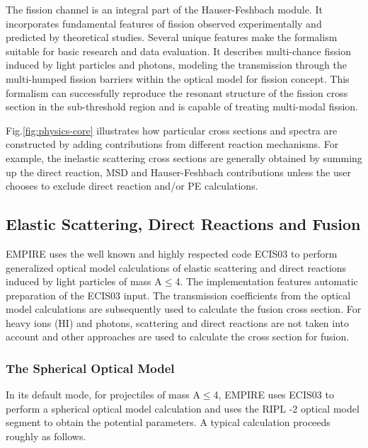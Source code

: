 The fission channel is an integral part of the Hauser-Feshbach module. It
incorporates fundamental features of fission observed experimentally and
predicted by theoretical studies. Several unique features make the formalism
suitable for basic research and data evaluation. It describes multi-chance
fission induced by light particles and photons, modeling the transmission
through the multi-humped fission barriers within the optical model for
fission concept. This formalism can successfully reproduce the resonant
structure of the fission cross section in the sub-threshold region and is
capable of treating multi-modal fission.

Fig.\ref{fig:physics-core} illustrates how particular cross sections and
spectra are constructed by adding contributions from different reaction
mechanisms. For example, the inelastic scattering cross sections are
generally obtained by summing up the direct reaction, MSD and
Hauser-Feshbach contributions unless the user chooses to exclude direct reaction
and/or PE calculations.


\subsection{Elastic Scattering, Direct Reactions and Fusion}

EMPIRE uses the well known and highly respected code ECIS03 \cite{ECIS} to
perform generalized optical model calculations of elastic scattering and
direct reactions induced by light particles of mass A$\leq$4. The
implementation features automatic preparation of the ECIS03 input. The
transmission coefficients from the optical model calculations are
subsequently used to calculate the fusion cross section. For heavy ions (HI)
and photons, scattering and direct reactions are not taken into account and
other approaches are used to calculate the cross section for fusion.

\subsubsection{The Spherical Optical Model\label{sec:sph-opt}}

In its default mode, for projectiles of mass A$\leq$4, EMPIRE uses ECIS03 to
perform a spherical optical model calculation and uses the RIPL%
-2 \cite{RIPL2} optical model segment to obtain the potential
parameters. A typical calculation proceeds roughly as follows.

